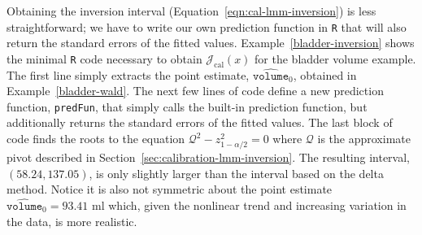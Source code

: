 \documentclass[cmfont,usenames,dvipsnames,leqno]{afit-etd}\usepackage[]{graphicx}\usepackage[]{color}
\newcommand{\code}[1]{\texttt{\small{#1}}}
\newcommand{\mc}[1]{\ensuremath{\mathcal{#1}}}
\newcommand{\wh}[1]{\ensuremath{\widehat{#1}}}
\begin{document}
Obtaining the inversion interval (Equation~\eqref{eqn:cal-lmm-inversion}) is less straightforward; we have to write our own prediction function in \code{R} that will also return the standard errors of the fitted values. Example~\ref{bladder-inversion} shows the minimal \code{R} code necessary to obtain $\mc{J}_\mathrm{cal}(x)$ for the bladder volume example. The first line simply extracts the point estimate, $\wh{\texttt{volume}}_0$, obtained in Example~\ref{bladder-wald}. The next few lines of code define a new prediction function, \code{predFun}, that simply calls the built-in prediction function, but additionally returns the standard errors of the fitted values. The last block of code finds the roots to the equation $\mc{Q}^2 - z_{1-\alpha/2}^2 = 0$ where $\mc{Q}$ is the approximate pivot described in Section~\ref{sec:calibration-lmm-inversion}. The resulting interval, $(58.24, 137.05)$, is only slightly larger than the interval based on the delta method. Notice it is also not symmetric about the point estimate $\wh{\texttt{volume}}_0 = 93.41 \text{ ml}$ which, given the nonlinear trend and increasing variation in the data, is more realistic. 
\end{document}
